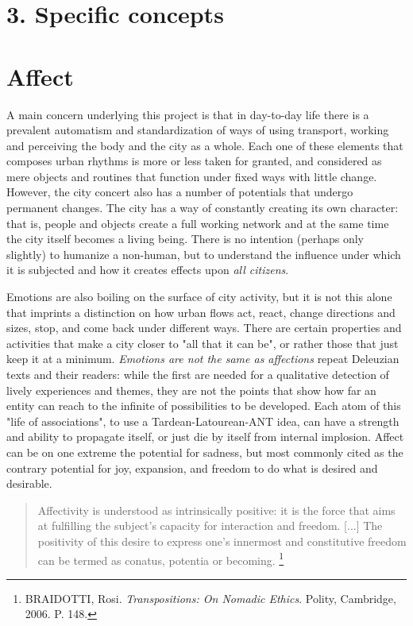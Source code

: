 \section*{3. Specific concepts}

\section*{Affect}

A main concern underlying this project is that in day-to-day life there is a prevalent automatism and standardization of ways of using transport, working and perceiving the body and the city as a whole. Each one of these elements that composes urban rhythms is more or less taken for granted, and considered as mere objects and routines that function under fixed ways with little change. However, the city concert also has a number of potentials %
that undergo permanent changes. The city has a way of constantly creating its own character: that is, people and objects create a full working network and at the same time the city itself becomes a living being. There is no intention (perhaps only slightly) to humanize a non-human, but to understand the influence under which it is subjected and how it creates effects upon \textit{all citizens}.

Emotions are also boiling on the surface of city activity, but it is not this alone that imprints a distinction on how urban flows act, react, change directions and sizes, stop, and come back under different ways. There are certain properties and activities that make a city closer to "all that it can be", or rather those that just keep it at a minimum. \textit{Emotions are not the same as affections} repeat Deleuzian texts and their readers: while the first are needed for a qualitative detection of lively experiences and themes, they are not the points that show how far an entity can reach to the infinite of possibilities to be developed. Each atom of this "life of associations", to use a Tardean-Latourean-ANT idea, can have a strength and ability to propagate itself, or just die by itself from internal implosion. Affect can be on one extreme the potential for sadness, but most commonly cited as the contrary potential for joy, expansion, and freedom to do what is desired and desirable.

\begin{quote}
 Affectivity is understood as intrinsically positive: it is the force that aims at fulfilling the subject's capacity for interaction and freedom. [...] The positivity of this desire to express one's innermost and constitutive freedom can be termed as conatus, potentia or becoming.%
 \footnote{BRAIDOTTI, Rosi. \textit{Transpositions: On Nomadic Ethics}. Polity, Cambridge, 2006. P. 148.}
\end{quote}

